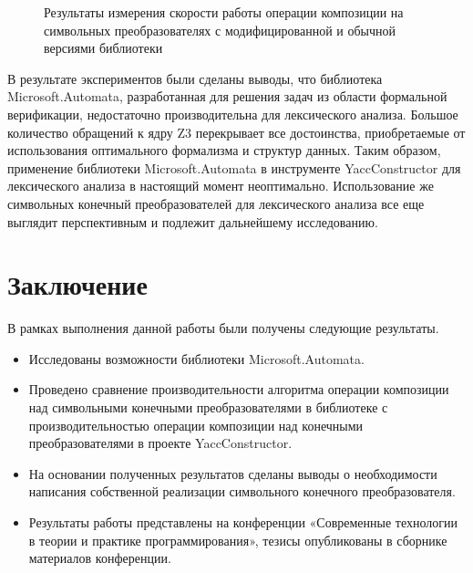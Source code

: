 \documentclass[14pt]{matmex-diploma}
\begin{document}
\begin{figure}[H]
\begin{center}
\end{center}
\caption{Результаты измерения скорости работы операции композиции на символьных преобразователях с модифицированной и обычной версиями библиотеки}
\label{graph2}
\end{figure}

В результате экспериментов были сделаны выводы, что библиотека Microsoft.Automata, разработанная для решения задач из области формальной верификации, недостаточно производительна для лексического анализа. Большое количество обращений к ядру Z3 перекрывает все достоинства, приобретаемые от использования оптимального формализма и структур данных. Таким образом, применение библиотеки Microsoft.Automata в инструменте YaccConstructor для лексического анализа в настоящий момент неоптимально. 
Использование же символьных конечный преобразователей для лексического анализа все еще выглядит перспективным и подлежит дальнейшему исследованию.

\section*{Заключение}
В рамках выполнения данной работы были получены следующие результаты.
\begin{itemize}
\item Исследованы возможности библиотеки Microsoft.Automata.
\item Проведено сравнение производительности алгоритма операции композиции над символьными конечными преобразователями в библиотеке с производительностью операции композиции над конечными преобразователями в проекте YaccConstructor.
\item На основании полученных результатов сделаны выводы о необходимости написания собственной реализации символьного конечного преобразователя.
\item Результаты работы представлены на конференции «Современные технологии в теории и практике программирования», тезисы опубликованы в сборнике материалов конференции.
\end{itemize}
\end{document}

